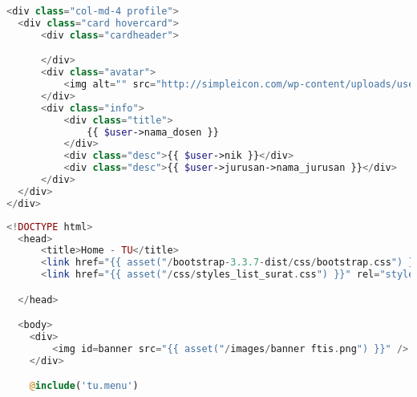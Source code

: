 \begin{lstlisting}[language=php,basicstyle=\tiny,caption=\textit{Sidebar} untuk pejabat]
	<div class="col-md-4 profile">
  <div class="card hovercard">
      <div class="cardheader">

      </div>
      <div class="avatar">
          <img alt="" src="http://simpleicon.com/wp-content/uploads/user1.png">
      </div>
      <div class="info">
          <div class="title">
              {{ $user->nama_dosen }}
          </div>
          <div class="desc">{{ $user->nik }}</div>
          <div class="desc">{{ $user->jurusan->nama_jurusan }}</div>
      </div>
  </div>
</div>

\end{lstlisting}

\begin{lstlisting}[language=php,basicstyle=\tiny,caption=\textit{Home} TU]
	<!DOCTYPE html>
  <head>
      <title>Home - TU</title>
      <link href="{{ asset("/bootstrap-3.3.7-dist/css/bootstrap.css") }}" rel="stylesheet" type="text/css" />
      <link href="{{ asset("/css/styles_list_surat.css") }}" rel="stylesheet" type="text/css">

  </head>

  <body>
    <div>
        <img id=banner src="{{ asset("/images/banner ftis.png") }}" />
    </div>

    @include('tu.menu')


\end{lstlisting}
